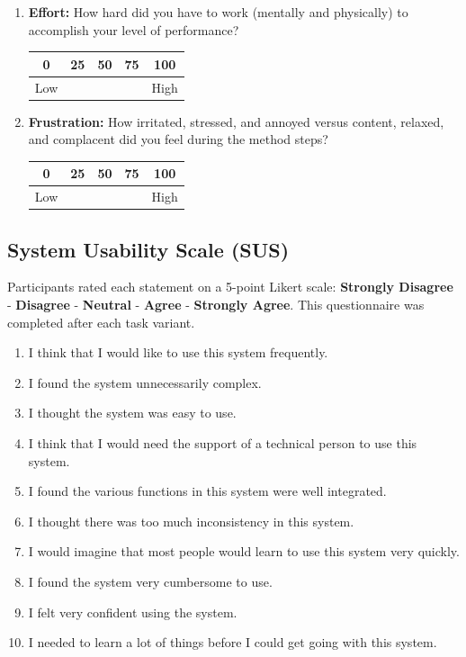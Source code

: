 \begin{enumerate}
    \item \textbf{Effort:} How hard did you have to work (mentally and physically) to accomplish your level of performance?
    \begin{center}
        \begin{tabular}{|c|c|c|c|c|}
        \hline
        0 & 25 & 50 & 75 & 100 \\
        \hline
        Low & & & & High \\
        \hline
        \end{tabular}
    \end{center}
    
    \item \textbf{Frustration:} How irritated, stressed, and annoyed versus content, relaxed, and complacent did you feel during the method steps?
    \begin{center}
        \begin{tabular}{|c|c|c|c|c|}
        \hline
        0 & 25 & 50 & 75 & 100 \\
        \hline
        Low & & & & High \\
        \hline
        \end{tabular}
    \end{center}
\end{enumerate}

\subsection{System Usability Scale (SUS)}
\label{appendix:sus}

Participants rated each statement on a 5-point Likert scale: \textbf{Strongly Disagree} - \textbf{Disagree} - \textbf{Neutral} - \textbf{Agree} - \textbf{Strongly Agree}. This questionnaire was completed after each task variant.

\begin{enumerate}
    \item I think that I would like to use this system frequently.
    \item I found the system unnecessarily complex.
    \item I thought the system was easy to use.
    \item I think that I would need the support of a technical person to use this system.
    \item I found the various functions in this system were well integrated.
    \item I thought there was too much inconsistency in this system.
    \item I would imagine that most people would learn to use this system very quickly.
    \item I found the system very cumbersome to use.
    \item I felt very confident using the system.
    \item I needed to learn a lot of things before I could get going with this system.
\end{enumerate}

